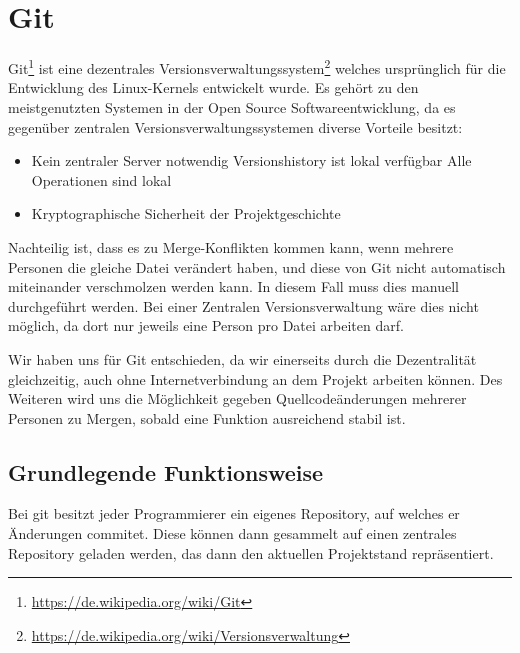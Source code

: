 

\section{Git}
\label{sec:dev-git}
Git\footnote{\url{https://de.wikipedia.org/wiki/Git}} ist eine dezentrales Versionsverwaltungssystem\footnote{\url{https://de.wikipedia.org/wiki/Versionsverwaltung}} welches urspr\"unglich f\"ur die Entwicklung des Linux-Kernels entwickelt wurde. Es geh\"ort zu den meistgenutzten Systemen in der Open Source Softwareentwicklung, da es gegen\"uber zentralen Versionsverwaltungssystemen diverse Vorteile besitzt:

\begin{itemize}
  \item Kein zentraler Server notwendig
  \subitem Versionshistory ist lokal verf\"ugbar
  \subitem Alle Operationen sind lokal
  \item Kryptographische Sicherheit der Projektgeschichte
\end{itemize}

Nachteilig ist, dass es zu Merge-Konflikten kommen kann, wenn mehrere Personen die gleiche Datei ver\"andert haben, und diese von Git nicht automatisch miteinander verschmolzen werden kann. In diesem Fall muss dies manuell durchgef\"uhrt werden. Bei einer Zentralen Versionsverwaltung w\"are dies nicht m\"oglich, da dort nur jeweils eine Person pro Datei arbeiten darf.

Wir haben uns f\"ur Git entschieden, da wir einerseits durch die Dezentralit\"at gleichzeitig, auch ohne Internetverbindung an dem Projekt arbeiten k\"onnen. Des Weiteren wird uns die M\"oglichkeit gegeben Quellcode\"anderungen mehrerer Personen zu Mergen, sobald eine Funktion ausreichend stabil ist.

\subsection{Grundlegende Funktionsweise}

Bei git besitzt jeder Programmierer ein eigenes Repository, auf welches er \"Anderungen commitet. Diese k\"onnen dann gesammelt auf einen zentrales Repository geladen werden, das dann den aktuellen Projektstand repr\"asentiert.

